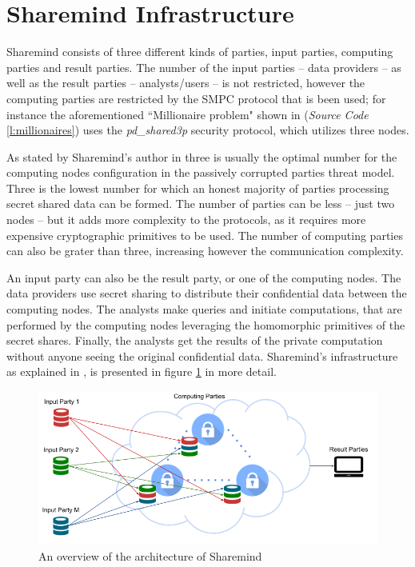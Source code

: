 \section{Sharemind Infrastructure}\label{sharemind-infrastructure}
Sharemind consists of three different kinds of parties, input parties, computing parties and result parties.
The number of the input parties -- data providers -- as well as the result parties -- analysts/users -- is not restricted, however the computing parties are restricted by the SMPC protocol that is been used; for instance the aforementioned ``Millionaire problem" shown in (\textit{Source Code} \ref{l:millionaires}) uses the \textit{pd\_shared3p} security protocol, which utilizes three nodes.

As stated by Sharemind's author in \cite{bogdanov2013sharemind} three is usually the optimal number for the computing nodes configuration in the passively corrupted parties threat model.
Three is the lowest number for which an honest majority of parties processing secret shared data can be formed.
The number of parties can be less -- just two nodes -- but it adds more complexity to the protocols, as it requires more expensive cryptographic primitives to be used.
The number of computing parties can also be grater than three, increasing however the communication complexity.

An input party can also be the result party, or one of the computing nodes.
The data providers use secret sharing to distribute their confidential data between the computing nodes.
The analysts make queries and initiate computations, that are performed by the computing nodes leveraging the homomorphic primitives of the secret shares.
Finally, the analysts get the results of the private computation without anyone seeing the original confidential data.
Sharemind's infrastructure as explained in \cite{turban2014secure}, is presented in figure \ref{f:sharemind} in more detail.


\begin{figure}[th]
  \centering
  \includegraphics[width=\linewidth]{figures/sharemind_infrastructure.png}
  \caption{An overview of the architecture of Sharemind}\label{f:sharemind}
\end{figure}


